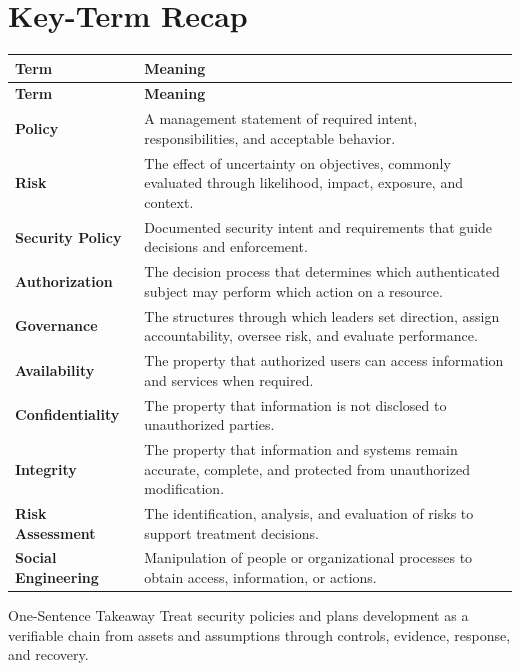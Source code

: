 \documentclass[11pt,letterpaper]{article}
\begin{document}
\section*{Key-Term Recap}
\begin{longtable}{>{\raggedright\arraybackslash}p{}>{\raggedright\arraybackslash}p{}}
\toprule\rowcolor{Navy}\color{white}\textbf{Term} & \color{white}\textbf{Meaning}\\\midrule
\endfirsthead
\toprule\rowcolor{Navy}\color{white}\textbf{Term} & \color{white}\textbf{Meaning}\\\midrule
\endhead
\textbf{Policy} & A management statement of required intent, responsibilities, and acceptable behavior. \\\midrule
\textbf{Risk} & The effect of uncertainty on objectives, commonly evaluated through likelihood, impact, exposure, and context. \\\midrule
\textbf{Security Policy} & Documented security intent and requirements that guide decisions and enforcement. \\\midrule
\textbf{Authorization} & The decision process that determines which authenticated subject may perform which action on a resource. \\\midrule
\textbf{Governance} & The structures through which leaders set direction, assign accountability, oversee risk, and evaluate performance. \\\midrule
\textbf{Availability} & The property that authorized users can access information and services when required. \\\midrule
\textbf{Confidentiality} & The property that information is not disclosed to unauthorized parties. \\\midrule
\textbf{Integrity} & The property that information and systems remain accurate, complete, and protected from unauthorized modification. \\\midrule
\textbf{Risk Assessment} & The identification, analysis, and evaluation of risks to support treatment decisions. \\\midrule
\textbf{Social Engineering} & Manipulation of people or organizational processes to obtain access, information, or actions. \\\midrule
\bottomrule
\end{longtable}
\begin{CornellExamBox}{One-Sentence Takeaway}
Treat security policies and plans development as a verifiable chain from assets and assumptions through controls, evidence, response, and recovery.
\end{CornellExamBox}
\end{document}
